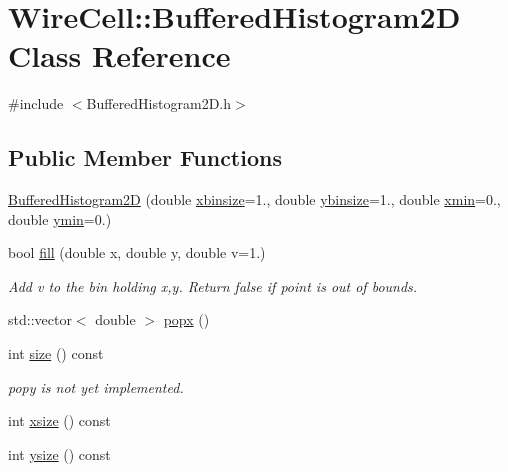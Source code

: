 \hypertarget{class_wire_cell_1_1_buffered_histogram2_d}{}\section{Wire\+Cell\+:\+:Buffered\+Histogram2D Class Reference}
\label{class_wire_cell_1_1_buffered_histogram2_d}


{\ttfamily \#include $<$Buffered\+Histogram2\+D.\+h$>$}

\subsection*{Public Member Functions}
\begin{DoxyCompactItemize}
\item 
\hyperlink{class_wire_cell_1_1_buffered_histogram2_d_a152ca655ff3547703ea3c41849af83aa}{Buffered\+Histogram2D} (double \hyperlink{class_wire_cell_1_1_buffered_histogram2_d_a3c2df0d26df3d418fe85d01ac21bf868}{xbinsize}=1., double \hyperlink{class_wire_cell_1_1_buffered_histogram2_d_abb36fbf4ad399b56d7c72556e596a7c4}{ybinsize}=1., double \hyperlink{class_wire_cell_1_1_buffered_histogram2_d_a282c0f0144e547a7893760993461d4d7}{xmin}=0., double \hyperlink{class_wire_cell_1_1_buffered_histogram2_d_a772cc0d25c6cf84beb629960d5e3e440}{ymin}=0.)
\item 
bool \hyperlink{class_wire_cell_1_1_buffered_histogram2_d_aad0ca16181ede3b04c11f8e192a3a58e}{fill} (double x, double y, double v=1.)
\begin{DoxyCompactList}\small\item\em Add v to the bin holding x,y. Return false if point is out of bounds. \end{DoxyCompactList}\item 
std\+::vector$<$ double $>$ \hyperlink{class_wire_cell_1_1_buffered_histogram2_d_afc75d4003198ed485a4677eeac52a420}{popx} ()
\item 
int \hyperlink{class_wire_cell_1_1_buffered_histogram2_d_a137d22d7e24ae8f1cd8a99608601bceb}{size} () const
\begin{DoxyCompactList}\small\item\em popy is not yet implemented. \end{DoxyCompactList}\item 
int \hyperlink{class_wire_cell_1_1_buffered_histogram2_d_a2ce3d1a3085fe45c039d65b00907d4a6}{xsize} () const
\item 
int \hyperlink{class_wire_cell_1_1_buffered_histogram2_d_adbf757c3cdbfd1c6f09474bc8a9c2a8f}{ysize} () const

\end{DoxyCompactItemize}
